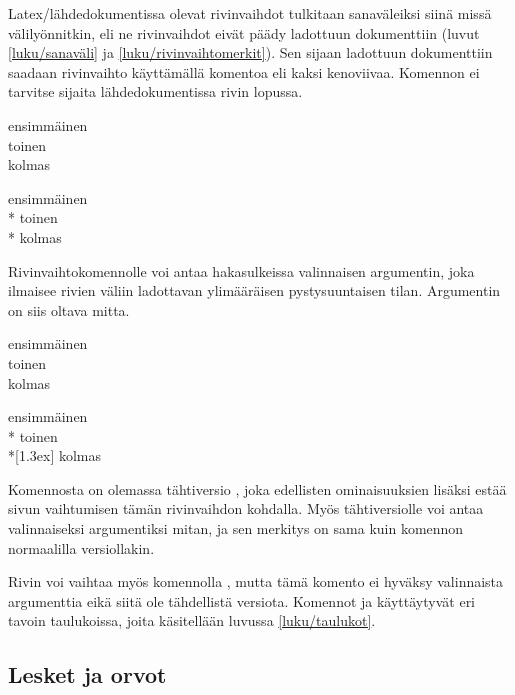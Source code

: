Latex\-/lähdedokumentissa olevat rivinvaihdot tulkitaan sanaväleiksi
siinä missä välilyönnitkin, eli ne rivinvaihdot eivät päädy ladottuun
dokumenttiin (luvut \ref{luku/sanaväli} ja
\ref{luku/rivinvaihtomerkit}). Sen sijaan ladottuun dokumenttiin saadaan
rivinvaihto käyttämällä komentoa \komentom{\keno} eli kaksi kenoviivaa.
Komennon ei tarvitse sijaita lähdedokumentissa rivin lopussa.

\komentoi{\keno}
\begin{koodilohkosis}
ensimmäinen \\ toinen \\
kolmas
\end{koodilohkosis}

\begin{tulossis}
  ensimmäinen \\* toinen \\* kolmas
\end{tulossis}

\noindent
Rivinvaihtokomennolle voi antaa hakasulkeissa valinnaisen argumentin,
joka ilmaisee rivien väliin ladottavan ylimääräisen pystysuuntaisen
tilan. Argumentin on siis oltava mitta.

\komentoi{\keno}
\begin{koodilohkosis}
ensimmäinen \\ toinen \\[1.3ex] kolmas
\end{koodilohkosis}

\begin{tulossis}
  ensimmäinen \\* toinen \\*[1.3ex] kolmas
\end{tulossis}

\noindent
Komennosta on olemassa tähtiversio \komentom{\keno *}, joka edellisten
ominaisuuksien lisäksi estää sivun vaihtumisen tämän rivinvaihdon
kohdalla. Myös tähtiversiolle voi antaa valinnaiseksi argumentiksi
mitan, ja sen merkitys on sama kuin komennon normaalilla versiollakin.

Rivin voi vaihtaa myös komennolla , mutta tämä komento
ei hyväksy valinnaista argumenttia eikä siitä ole tähdellistä versiota.
Komennot  ja \komento{\keno} käyttäytyvät eri tavoin
taulukoissa, joita käsitellään luvussa \ref{luku/taulukot}.

\subsection{Lesket ja orvot}

